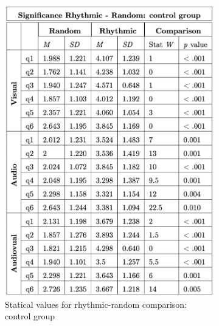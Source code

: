 \begin{figure}[htbp]
    \centering
    \begin{subfigure}[htbp]{0.33\textwidth}
        \centering
        \includegraphics[width=\textwidth]{significance_tables/control_group.png}
        \caption{Statical values for rhythmic-random comparison: control group}
        \label{fig: significance rhythmic-random control} 
    \end{subfigure} 
    \begin{subfigure}[htbp]{0.33\textwidth}
        \centering

\end{subfigure}
\end{figure}
